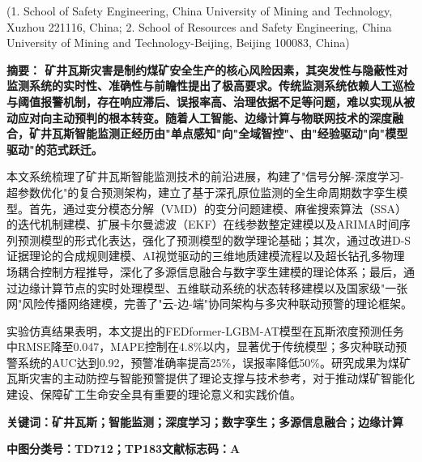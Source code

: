 \documentclass[twocolumn,a4paper]{ctexart}
\numberwithin{equation}{section}
\begin{document}
\begin{center}
(1. School of Safety Engineering, China University of Mining and Technology, Xuzhou 221116, China;
2. School of Resources and Safety Engineering, China University of Mining and Technology-Beijing, Beijing 100083, China)
\end{center}

\vspace{1\baselineskip}

\noindent{}\heiti\bfseries 摘\quad 要：\songti
矿井瓦斯灾害是制约煤矿安全生产的核心风险因素，其突发性与隐蔽性对监测系统的实时性、准确性与前瞻性提出了极高要求。传统监测系统依赖人工巡检与阈值报警机制，存在响应滞后、误报率高、治理依据不足等问题，难以实现从被动应对向主动预判的根本转变。随着人工智能、边缘计算与物联网技术的深度融合，矿井瓦斯智能监测正经历由"单点感知"向"全域智控"、由"经验驱动"向"模型驱动"的范式跃迁。

本文系统梳理了矿井瓦斯智能监测技术的前沿进展，构建了"信号分解-深度学习-超参数优化"的复合预测架构，建立了基于深孔原位监测的全生命周期数字孪生模型。首先，通过变分模态分解（VMD）的变分问题建模、麻雀搜索算法（SSA）的迭代机制建模、扩展卡尔曼滤波（EKF）在线参数整定建模以及ARIMA时间序列预测模型的形式化表达，强化了预测模型的数学理论基础；其次，通过改进D-S证据理论的合成规则建模、AI视觉驱动的三维地质建模流程以及超长钻孔多物理场耦合控制方程推导，深化了多源信息融合与数字孪生建模的理论体系；最后，通过边缘计算节点的实时处理模型、五维联动系统的状态转移建模以及国家级"一张网"风险传播网络建模，完善了"云-边-端"协同架构与多灾种联动预警的理论框架。

实验仿真结果表明，本文提出的FEDformer-LGBM-AT模型在瓦斯浓度预测任务中RMSE降至0.047，MAPE控制在4.8\%以内，显著优于传统模型；多灾种联动预警系统的AUC达到0.92，预警准确率提高25\%，误报率降低50\%。研究成果为煤矿瓦斯灾害的主动防控与智能预警提供了理论支撑与技术参考，对于推动煤矿智能化建设、保障矿工生命安全具有重要的理论意义和实践价值。

\vspace{0.5\baselineskip}
\noindent{}\heiti\bfseries 关键词：\songti 矿井瓦斯；智能监测；深度学习；数字孪生；多源信息融合；边缘计算

\vspace{0.3\baselineskip}
\noindent{}\heiti\bfseries 中图分类号：\songti TD712；TP183\quad\quad\heiti\bfseries 文献标志码：\songti A

\vspace{1\baselineskip}
\end{document}
